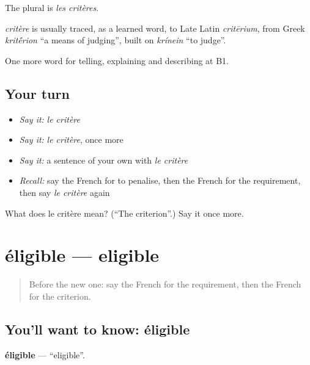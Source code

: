 The plural is \emph{les critères}.

\begin{cousinweb}
\emph{critère} is usually traced, as a learned word, to Late Latin \emph{critērium}, from Greek \emph{krit\'{\={e}}rion} \textquotedblleft{}a means of judging\textquotedblright{}, built on \emph{krínein} \textquotedblleft{}to judge\textquotedblright{}.
\end{cousinweb}

\begin{grammarlens}[title={What you've built}]
One more word for telling, explaining and describing at B1.
\end{grammarlens}

\subsection*{Your turn}
\begin{itemize}
\raggedright
  \item \emph{Say it:} \emph{le critère}
  \item \emph{Say it:} \emph{le critère}, once more
  \item \emph{Say it:} a sentence of your own with \emph{le critère}
  \item \emph{Recall:} say the French for to penalise, then the French for the requirement, then say \emph{le critère} again
\end{itemize}

\begin{tcolorbox}[breakable,colback=teal!4,colframe=teal!35!black,title={Before you move on}]
What does le critère mean? (\textquotedblleft{}The criterion\textquotedblright{}.) Say it once more.
\end{tcolorbox}
\section[éligible]{éligible — eligible}

\label{lesson:FR-C383-eligible}



\begin{quote}
Before the new one: say the French for the requirement, then the French for the criterion.
\end{quote}

\subsection*{You'll want to know: éligible}
\textbf{éligible} — \textquotedblleft{}eligible\textquotedblright{}.

